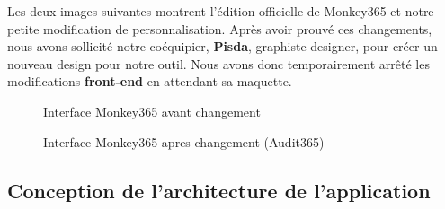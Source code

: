 Les deux images suivantes montrent l'édition officielle de Monkey365 et notre petite modification de personnalisation. Après avoir prouvé ces changements, nous avons sollicité notre coéquipier, \textbf{Pisda}, graphiste designer, pour créer un nouveau design pour notre outil. Nous avons donc temporairement arrêté les modifications \textbf{front-end} en attendant sa maquette.

\begin{figure}[H]
    \begin{center}
        \caption{Interface Monkey365 avant changement}
    \end{center}
\end{figure}

\begin{figure}[H]
    \begin{center}
        \caption{Interface Monkey365 apres changement (Audit365)}
    \end{center}
\end{figure}

\subsection{Conception de l’architecture de l'application}

